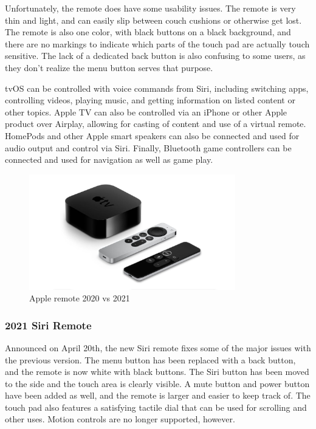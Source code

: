 \documentclass[12pt, letterpaper]{article}
\begin{document}
Unfortunately, the remote does have some usability issues.  The remote is very thin and light, and can easily slip between couch cushions or otherwise get lost. The remote is also one color, with black buttons on a black background, and there are no markings to indicate which parts of the touch pad are actually touch sensitive. The lack of a dedicated back button is also confusing to some users, as they don't realize the menu button serves that purpose.

tvOS can be controlled with voice commands from Siri, including switching apps, controlling videos, playing music, and getting information on listed content or other topics\cite{apple_support}. Apple TV can also be controlled via an iPhone or other Apple product over Airplay, allowing for casting of content and use of a virtual remote. HomePods and other Apple smart speakers can also be connected and used for audio output and control via Siri. Finally, Bluetooth game controllers can be connected and used for navigation as well as game play.
\begin{figure}[h]
    \centering
    \includegraphics[width=0.8\textwidth]{appletvremote202117_small.jpg}
    \caption{Apple remote 2020 vs 2021}
\end{figure}

\subsubsection{2021 Siri Remote}
Announced on April 20th, the new Siri remote fixes some of the major issues with the previous version. The menu button has been replaced with a back button, and the remote is now white with black buttons.  The Siri button has been moved to the side and the touch area is clearly visible. A mute button and power button have been added as well, and the remote is larger and easier to keep track of. The touch pad also features a satisfying tactile dial that can be used for scrolling and other uses. Motion controls are no longer supported, however.
\end{document}
